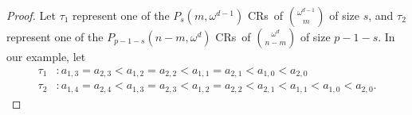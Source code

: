\documentclass[11pt]{article}
\newcommand{\om}{\omega}
\newcommand{\crulenospace}{CR}
\newcommand{\crules}{\crulenospace s~}
\newcommand{\numpoints}{n}
\newcommand{\commonconst}{a}
\theoremstyle{plain}
\theoremstyle{definition}
\begin{document}
\begin{proof}
Let $\tau_1$ represent one of the $P_s\left(m, \om^{d-1}\right)$ \crules of $\binom{\om^{d-1}}{m}$ of size $s$, and $\tau_2$ represent one of the $P_{p-1-s}\left(\numpoints-m, \om^d\right)$ \crules of $\binom{\om^{d}}{\numpoints-m}$ of size $p-1-s$. In our example, let \begin{align*}
\tau_1 & \colon \commonconst_{1,3} = \commonconst_{2,3} < \commonconst_{1,2} = \commonconst_{2,2} < \commonconst_{1,1} = \commonconst_{2,1} < \commonconst_{1,0} < \commonconst_{2,0}\\
\tau_2 & \colon \commonconst_{1,4} = \commonconst_{2,4} < \commonconst_{1,3} = \commonconst_{2,3} < \commonconst_{1,2} = \commonconst_{2,2} < \commonconst_{2,1} < \commonconst_{1,1} < \commonconst_{1,0} < \commonconst_{2,0}.
\end{align*}


\end{proof}
\end{document}
